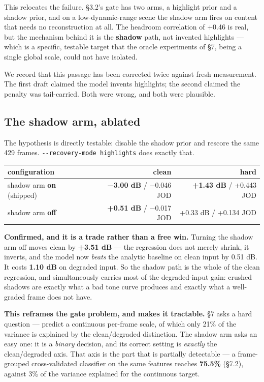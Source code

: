 This relocates the failure. §3.2's gate has two arms, a highlight prior and a
shadow prior, and on a low-dynamic-range scene the shadow arm fires on content
that needs no reconstruction at all. The headroom correlation of +0.46 is real,
but the mechanism behind it is the \textbf{shadow} path, not invented highlights ---
which is a specific, testable target that the oracle experiments of §7, being a
single global scale, could not have isolated.

We record that this passage has been corrected twice against fresh measurement.
The first draft claimed the model invents highlights; the second claimed the
penalty was tail-carried. Both were wrong, and both were plausible.

\hypertarget{the-shadow-arm-ablated}{%
\subsection{The shadow arm, ablated}\label{the-shadow-arm-ablated}}

The hypothesis is directly testable: disable the shadow prior and rescore the
same 429 frames. \texttt{-\/-recovery-mode\ highlights} does exactly that.

\begin{longtable}[]{@{}lrr@{}}
\toprule
configuration & clean & hard\tabularnewline
\midrule
\endhead
shadow arm \textbf{on} (shipped) & \textbf{−3.00 dB} / −0.046 JOD & \textbf{+1.43 dB} / +0.443 JOD\tabularnewline
shadow arm \textbf{off} & \textbf{+0.51 dB} / −0.017 JOD & +0.33 dB / +0.134 JOD\tabularnewline
\bottomrule
\end{longtable}

\textbf{Confirmed, and it is a trade rather than a free win.} Turning the shadow arm
off moves clean by \textbf{+3.51 dB} --- the regression does not merely shrink, it
inverts, and the model now \emph{beats} the analytic baseline on clean input by
0.51 dB. It costs \textbf{1.10 dB} on degraded input. So the shadow path is the whole
of the clean regression, and simultaneously carries most of the degraded-input
gain: crushed shadows are exactly what a bad tone curve produces and exactly
what a well-graded frame does not have.

\textbf{This reframes the gate problem, and makes it tractable.} §7 asks a hard
question --- predict a continuous per-frame scale, of which only 21\% of the
variance is explained by the clean/degraded distinction. The shadow arm asks an
easy one: it is a \emph{binary} decision, and its correct setting is \emph{exactly} the
clean/degraded axis. That axis is the part that is partially detectable --- a
frame-grouped cross-validated classifier on the same features reaches \textbf{75.5\%}
(§7.2), against 3\% of the variance explained for the continuous target.

